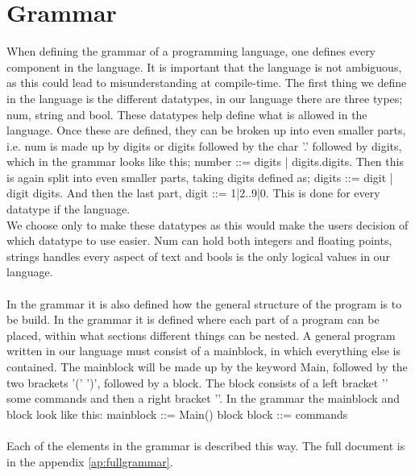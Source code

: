 \section{Grammar}
When defining the grammar of a programming language, one defines every component in the language. It is important that the language is not ambiguous, as this could lead to misunderstanding at compile-time.
The first thing we define in the language is the different datatypes, in our language there are three types; num, string and bool. These datatypes help define what is allowed in the language.
Once these are defined, they can be broken up into even smaller parts, i.e. num is made up by digits or digits followed by the char '.' followed by digits, which in the grammar looks like this; number ::= digits | digits.digits.
Then this is again split into even smaller parts, taking digits defined as; digits ::= digit | digit digits. And then the last part, digit ::= 1|2..9|0. This is done for every datatype if the language.\\
We choose only to make these datatypes as this would make the users decision of which datatype to use easier. Num can hold both integers and floating points, strings handles every aspect of text and bools is the only logical values in our language.\\
\\
In the grammar it is also defined how the general structure of the program is to be build. In the grammar it is defined where each part of a program can be placed, within what sections different things can be nested. A general program written in our language must consist of a mainblock, in which everything else is contained. The mainblock will be made up by the keyword Main, followed by the two brackets '(' ')', followed by a block.
The block consists of a left bracket '{' some commands and then a right bracket '}'. In the grammar the mainblock and block look like this: mainblock ::= Main() block
block ::= { commands }\\
\\
Each of the elements in the grammar is described this way. The full document is in the appendix \ref{ap:fullgrammar}.